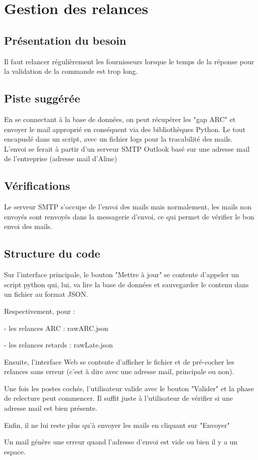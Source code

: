 
\chapter{Gestion des relances}


\section{Présentation du besoin}

Il faut relancer régulièrement les fournisseurs lorsque le temps de la réponse pour la validation de la commande est trop long.

\section{Piste suggérée}

En se connectant à la base de données, on peut récupérer les "gap ARC" et envoyer le mail approprié en conséquent via des bibliothèques Python. Le tout encapuslé dans un script, avec un fichier logs pour la tracabilité des mails.\\

L’envoi se ferait à partir d’un serveur SMTP Outlook basé sur une adresse mail de l’entreprise (adresse mail d'Aline)

\section{Vérifications}

Le serveur SMTP s’occupe de l’envoi des mails mais normalement, les mails non envoyés sont renvoyés dans la messagerie d’envoi, ce qui permet de vérifier le bon envoi des mails.




\section{Structure du code}

Sur l'interface principale, le bouton "Mettre à jour" se contente d'appeler un script python qui, lui, va lire la base de données et sauvegarder le contenu dans un fichier au format JSON.

Respectivement, pour :


- les relances ARC : rawARC.json

- les relances retards : rawLate.json


Ensuite, l'interface Web se contente d'afficher le fichier et de pré-cocher les relances sans erreur (c'est à dire avec une adresse mail, principale ou non).

Une fois les postes cochés, l'utilisateur valide avec le bouton "Valider" et la phase de relecture peut commencer. Il suffit juste à l'utilisateur de vérifier si une adresse mail est bien présente.

Enfin, il ne lui reste plus qu'à envoyer les mails en cliquant sur "Envoyer"

Un mail génère une erreur quand l'adresse d'envoi est vide ou bien il y a un espace. 
